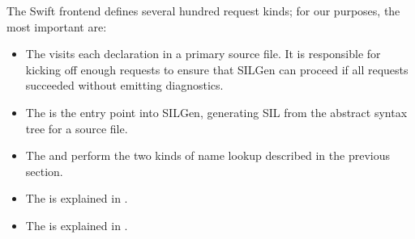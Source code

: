 \documentclass[../generics]{subfiles}
\begin{document}
The Swift frontend defines several hundred request kinds; for our purposes, the most important are:
\begin{itemize}
\item The  visits each declaration in a primary source file. It is responsible for kicking off enough requests to ensure that SILGen can proceed if all requests succeeded without emitting diagnostics.
\item The  is the entry point into SILGen, generating SIL from the abstract syntax tree for a source file.
\item The  and  perform the two kinds of name lookup described in the previous section.
\item The  is explained in .
\item The  is explained in .
\end{itemize}
\end{document}

